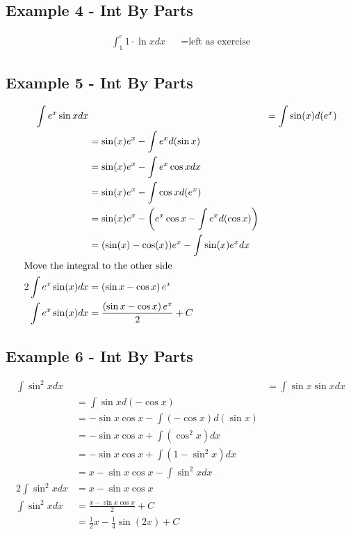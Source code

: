\subsection{Example 4 - Int By Parts}
\begin{align}
  \int_1^e 1\cdot\ln x dx &
  &= \text{left as exercise}
\end{align}

\subsection{Example 5 - Int By Parts}
\begin{align}
  \int e^x \sin x dx &
  &= \int \sin(x) d(e^x) \\
  &= \sin(x)e^x - \int e^x d(\sin x) \\
  &= \sin(x)e^x - \int e^x \cos x dx \\
  &= \sin(x)e^x - \int \cos x d(e^x) \\
  &= \sin(x)e^x - \left(e^x\cos x -\int e^x d(\cos x) \right) \\
  &= (\sin(x) - \cos(x))e^x - \int \sin(x)e^x dx \\
  \intertext{Move the integral to the other side}
  2 \int e^x \sin(x) dx &= \left( \sin x - \cos x \right)e^x \\
  \int e^x \sin(x) dx &= \frac{\left( \sin x - \cos x \right)e^x}{2} + C
\end{align}

\subsection{Example 6 - Int By Parts}
\begin{align}
  \int \sin^2 x dx &
  &= \int \sin x \sin x dx \\
  &= \int \sin x d(-\cos x) \\
  &= -\sin x \cos x - \int(-\cos x) d(\sin x) \\
  &= -\sin x \cos x + \int(\cos^2x) dx \\
  &= -\sin x \cos x + \int (1-\sin^2x) dx \\
  &= x- \sin x \cos x - \int \sin^2 x dx \\
  2 \int \sin^2 x dx &= x - \sin x \cos x \\
  \int \sin^2 x dx &= \frac{x - \sin x \cos x}{2} + C \\
  &= \frac{1}{2}x - \frac{1}{4}\sin(2x) + C
\end{align}

